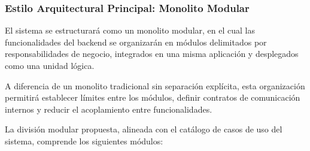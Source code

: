 \documentclass[11pt,a4paper,oneside]{article}
\begin{document}
\subsubsection{Estilo Arquitectural Principal: Monolito Modular}

El sistema se estructurará como un monolito modular, en el cual
las funcionalidades del backend se organizarán en módulos
delimitados por responsabilidades de negocio, integrados en una
misma aplicación y desplegados como una unidad lógica.

A diferencia de un monolito tradicional sin separación explícita,
esta organización permitirá establecer límites entre los módulos,
definir contratos de comunicación internos y reducir el
acoplamiento entre funcionalidades.

La división modular propuesta, alineada con el catálogo de
casos de uso del sistema, comprende los siguientes módulos:
\end{document}
